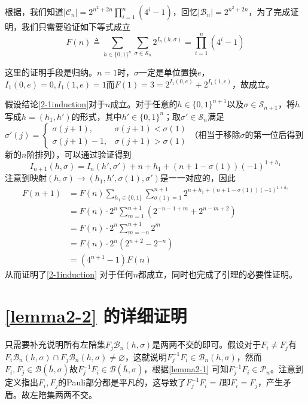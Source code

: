 \documentclass[8pt]{article}
\begin{document}
\begin{appendices}
根据\cite{paper2}，我们知道$|\mathcal C_n| = 2^{n^2 + 2n}\prod\limits_{i=1}^{n}(4^i-1)$，回忆$|\mathcal B_n| = 2^{n^2 + 2n}$，为了完成证明，我们只需要验证如下等式成立
\begin{equation}
F(n) \triangleq \sum_{h \in \{0, 1\}^n} \sum_{\sigma \in \mathcal S_n} 2^{I_n(h, \sigma)} = \prod_{i=1}^{n}(4^i-1)
\label{2-1induction}
\end{equation}

这里的证明手段是归纳。$n = 1$时，$\sigma$一定是单位置换$e$，$I_1(0, e) = 0, I_1(1, e) = 1$而$F(1) = 3 = 2^{I_1(0, e)} + 2^{I_1(1, e)}$，故成立。

假设结论\cref{2-1induction}对于$n$成立。对于任意的$h \in \{0, 1\}^{n+1}$以及$\sigma \in \mathcal S_{n+1}$，将$h$写成$h = (h_1, h')$的形式，其中$h' \in \{0, 1\}^n$；取$\sigma' \in \mathcal S_n$满足$\sigma'(j) = \begin{cases}
\sigma(j+1), & \sigma(j+1) < \sigma(1)\\
\sigma(j+1) - 1, & \sigma(j+1) > \sigma(1)
\end{cases}$（相当于移除$\sigma$的第一位后得到新的$n$阶排列），可以通过验证得到
\begin{equation}
I_{n+1}(h, \sigma) = I_n(h', \sigma') + n + h_1 + (n + 1 - \sigma(1))(-1)^{1 + h_1}
\end{equation}
注意到映射$(h, \sigma) \to (h_1, h', \sigma(1), \sigma')$是一一对应的，因此
\begin{equation}
\begin{split}
F(n+1) &= F(n)\sum_{h_1 \in \{0, 1\}} \sum_{\sigma(1) = 1}^{n+1} 2^{n + h_1 + (n+1-\sigma(1))(-1)^{1 + h_1}}\\
&= F(n)\cdot 2^n\sum_{m=1}^{n+1}(2^{-n-1+m} + 2^{n-m+2})\\
&= F(n)\cdot 2^n\sum_{m=-n}^{n+1}2^m\\
&= F(n)\cdot 2^n(2^{n+2} - 2^{-n})\\
&= (4^{n+1} - 1)F(n)
\end{split}
\end{equation}
从而证明了\cref{2-1induction} 对于任何$n$都成立，同时也完成了引理的必要性证明。
\section{\cref{lemma2-2} 的详细证明}\label{proof2-2}

只需要补充说明所有左陪集$F_j\mathcal B_n(h, \sigma)$是两两不交的即可。假设对于$F_i \neq F_j$有$F_i\mathcal B_n(h, \sigma) \cap F_j\mathcal B_n(h, \sigma) \neq \varnothing$，这就说明$F_j^{-1}F_i \in \mathcal B_n(h, \sigma)$，然而$F_i, F_j \in \mathcal B(\overline h, \sigma)$故$F_j^{-1}F_i \in \mathcal B(\overline h, \sigma)$，根据\cref{lemma2-1} 可知$F_j^{-1}F_i \in \mathcal P_n$。注意到定义指出$F_i, F_j$的Pauli部分都是平凡的，这导致了$F_j^{-1}F_i = I$即$F_i = F_j$，产生矛盾。故左陪集两两不交。


\end{appendices}
\end{document}
